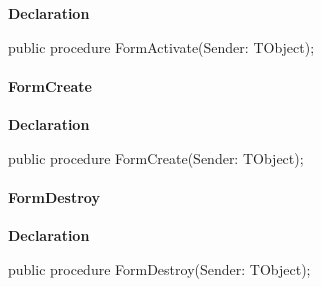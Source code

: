 \documentclass{report}
\newif\ifpdf
\begin{document}
\label{manager.TMnFrm-FormActivate}
\begin{list}{}{
\setlength{\itemindent}{0cm}
\setlength{\listparindent}{0cm}
\setlength{\leftmargin}{\evensidemargin}
\addtolength{\leftmargin}{\tmplength}
\settowidth{\labelsep}{X}
\addtolength{\leftmargin}{\labelsep}
\setlength{\labelwidth}{\tmplength}
}
\item[\textbf{Declaration}\hfill]
\ifpdf
\begin{flushleft}
\fi
\begin{ttfamily}
public procedure FormActivate(Sender: TObject);\end{ttfamily}

\ifpdf
\end{flushleft}
\fi

\end{list}
\paragraph*{FormCreate}\hspace*{\fill}

\label{manager.TMnFrm-FormCreate}
\begin{list}{}{
\setlength{\itemindent}{0cm}
\setlength{\listparindent}{0cm}
\setlength{\leftmargin}{\evensidemargin}
\addtolength{\leftmargin}{\tmplength}
\settowidth{\labelsep}{X}
\addtolength{\leftmargin}{\labelsep}
\setlength{\labelwidth}{\tmplength}
}
\item[\textbf{Declaration}\hfill]
\ifpdf
\begin{flushleft}
\fi
\begin{ttfamily}
public procedure FormCreate(Sender: TObject);\end{ttfamily}

\ifpdf
\end{flushleft}
\fi

\end{list}
\paragraph*{FormDestroy}\hspace*{\fill}

\label{manager.TMnFrm-FormDestroy}
\begin{list}{}{
\setlength{\itemindent}{0cm}
\setlength{\listparindent}{0cm}
\setlength{\leftmargin}{\evensidemargin}
\addtolength{\leftmargin}{\tmplength}
\settowidth{\labelsep}{X}
\addtolength{\leftmargin}{\labelsep}
\setlength{\labelwidth}{\tmplength}
}
\item[\textbf{Declaration}\hfill]
\ifpdf
\begin{flushleft}
\fi
\begin{ttfamily}
public procedure FormDestroy(Sender: TObject);\end{ttfamily}

\ifpdf
\end{flushleft}
\fi

\end{list}
\end{document}
